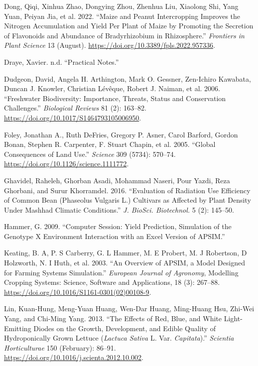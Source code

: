 \documentclass[
]{article}
\newlength{\cslhangindent}
\newenvironment{CSLReferences}[2] %
 {\begin{list}{}{%
  \setlength{\itemindent}{0pt}
  \setlength{\leftmargin}{0pt}
  \setlength{\parsep}{0pt}
  \ifodd #1
   \setlength{\leftmargin}{\cslhangindent}
   \setlength{\itemindent}{-1\cslhangindent}
  \fi
  \setlength{\itemsep}{#2\baselineskip}}}
 {\end{list}}
\begin{document}
\begin{CSLReferences}{1}{0}
Dong, Qiqi, Xinhua Zhao, Dongying Zhou, Zhenhua Liu, Xiaolong Shi, Yang
Yuan, Peiyan Jia, et al. 2022. {``Maize and Peanut Intercropping
Improves the Nitrogen Accumulation and Yield Per Plant of Maize by
Promoting the Secretion of Flavonoids and Abundance of {Bradyrhizobium}
in Rhizosphere.''} \emph{Frontiers in Plant Science} 13 (August).
\url{https://doi.org/10.3389/fpls.2022.957336}.

Draye, Xavier. n.d. {``Practical Notes.''}

Dudgeon, David, Angela H. Arthington, Mark O. Gessner, Zen-Ichiro
Kawabata, Duncan J. Knowler, Christian Lévêque, Robert J. Naiman, et al.
2006. {``Freshwater Biodiversity: Importance, Threats, Status and
Conservation Challenges.''} \emph{Biological Reviews} 81 (2): 163--82.
\url{https://doi.org/10.1017/S1464793105006950}.

Foley, Jonathan A., Ruth DeFries, Gregory P. Asner, Carol Barford,
Gordon Bonan, Stephen R. Carpenter, F. Stuart Chapin, et al. 2005.
{``Global {Consequences} of {Land} {Use}.''} \emph{Science} 309 (5734):
570--74. \url{https://doi.org/10.1126/science.1111772}.

Ghavidel, Raheleh, Ghorban Asadi, Mohammad Naseri, Pour Yazdi, Reza
Ghorbani, and Surur Khorramdel. 2016. {``Evaluation of Radiation Use
Efficiency of Common Bean ({Phaseolus} Vulgaris {L}.) Cultivars as
Affected by Plant Density Under {Mashhad} Climatic Conditions.''}
\emph{J. BioSci. Biotechnol.} 5 (2): 145--50.

Hammer, G. 2009. {``Computer Session: Yield Prediction, Simulation of
the Genotype {X} Environment Interaction with an {Excel} Version of
{APSIM}.''}

Keating, B. A, P. S Carberry, G. L Hammer, M. E Probert, M. J Robertson,
D Holzworth, N. I Huth, et al. 2003. {``An Overview of {APSIM}, a Model
Designed for Farming Systems Simulation.''} \emph{European Journal of
Agronomy}, Modelling {Cropping} {Systems}: {Science}, {Software} and
{Applications}, 18 (3): 267--88.
\url{https://doi.org/10.1016/S1161-0301(02)00108-9}.

Lin, Kuan-Hung, Meng-Yuan Huang, Wen-Dar Huang, Ming-Huang Hsu, Zhi-Wei
Yang, and Chi-Ming Yang. 2013. {``The Effects of Red, Blue, and White
Light-Emitting Diodes on the Growth, Development, and Edible Quality of
Hydroponically Grown Lettuce (\emph{{Lactuca} Sativa} {L}. Var.
\emph{Capitata}).''} \emph{Scientia Horticulturae} 150 (February):
86--91. \url{https://doi.org/10.1016/j.scienta.2012.10.002}.


\end{CSLReferences}
\end{document}
